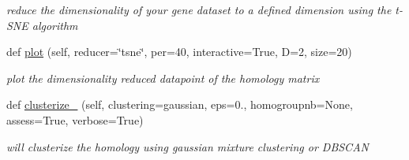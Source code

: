 \begin{DoxyCompactItemize}
\begin{DoxyCompactList}\small\item\em reduce the dimensionality of your gene dataset to a defined dimension using the t-\/\+S\+NE algorithm \end{DoxyCompactList}\item 
def \mbox{\hyperlink{class_py_c_u_b_1_1homology_1_1homology_a1a3802095c2ea6f426e803b055a2aea9}{plot}} (self, reducer=\char`\"{}tsne\char`\"{}, per=40, interactive=True, D=2, size=20)
\begin{DoxyCompactList}\small\item\em plot the dimensionality reduced datapoint of the homology matrix \end{DoxyCompactList}\item 
def \mbox{\hyperlink{class_py_c_u_b_1_1homology_1_1homology_a7e7748ba85bf571bb04df7a26e2c682c}{clusterize\+\_\+}} (self, clustering=\textquotesingle{}gaussian\textquotesingle{}, eps=0., homogroupnb=None, assess=True, verbose=True)
\begin{DoxyCompactList}\small\item\em will clusterize the homology using gaussian mixture clustering or D\+B\+S\+C\+AN \end{DoxyCompactList}\end{DoxyCompactItemize}

